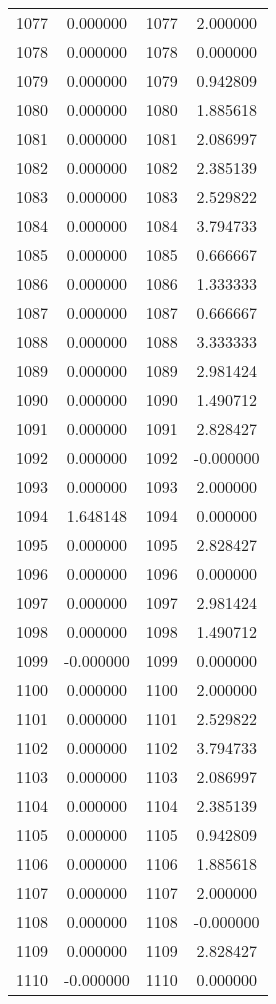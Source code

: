 \documentclass[12pt]{article}
\begin{document}
\begin{longtable}{@{}cccc@{}}
1077 & 0.000000 & 1077 & 2.000000 \\
1078 & 0.000000 & 1078 & 0.000000 \\
1079 & 0.000000 & 1079 & 0.942809 \\
1080 & 0.000000 & 1080 & 1.885618 \\
1081 & 0.000000 & 1081 & 2.086997 \\
1082 & 0.000000 & 1082 & 2.385139 \\
1083 & 0.000000 & 1083 & 2.529822 \\
1084 & 0.000000 & 1084 & 3.794733 \\
1085 & 0.000000 & 1085 & 0.666667 \\
1086 & 0.000000 & 1086 & 1.333333 \\
1087 & 0.000000 & 1087 & 0.666667 \\
1088 & 0.000000 & 1088 & 3.333333 \\
1089 & 0.000000 & 1089 & 2.981424 \\
1090 & 0.000000 & 1090 & 1.490712 \\
1091 & 0.000000 & 1091 & 2.828427 \\
1092 & 0.000000 & 1092 & -0.000000 \\
1093 & 0.000000 & 1093 & 2.000000 \\
1094 & 1.648148 & 1094 & 0.000000 \\
1095 & 0.000000 & 1095 & 2.828427 \\
1096 & 0.000000 & 1096 & 0.000000 \\
1097 & 0.000000 & 1097 & 2.981424 \\
1098 & 0.000000 & 1098 & 1.490712 \\
1099 & -0.000000 & 1099 & 0.000000 \\
1100 & 0.000000 & 1100 & 2.000000 \\
1101 & 0.000000 & 1101 & 2.529822 \\
1102 & 0.000000 & 1102 & 3.794733 \\
1103 & 0.000000 & 1103 & 2.086997 \\
1104 & 0.000000 & 1104 & 2.385139 \\
1105 & 0.000000 & 1105 & 0.942809 \\
1106 & 0.000000 & 1106 & 1.885618 \\
1107 & 0.000000 & 1107 & 2.000000 \\
1108 & 0.000000 & 1108 & -0.000000 \\
1109 & 0.000000 & 1109 & 2.828427 \\
1110 & -0.000000 & 1110 & 0.000000 \\

\end{longtable}
\end{document}
